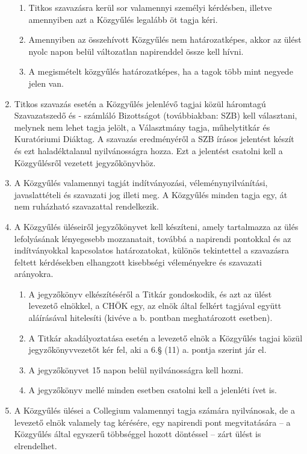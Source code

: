 \documentclass{../styles/rulebook}
\begin{document}
\begin{enumerate}
\begin{enumerate}
		\item Titkos szavazásra kerül sor valamennyi személyi kérdésben, illetve amennyiben azt a Közgyűlés legalább öt tagja kéri.
		\item Amennyiben az összehívott Közgyűlés nem határozatképes, akkor az ülést nyolc napon belül változatlan napirenddel össze kell hívni.
		\item A megismételt közgyűlés határozatképes, ha a tagok több mint negyede jelen van.
	\end{enumerate}
	\item Titkos szavazás esetén a Közgyűlés jelenlévő tagjai közül háromtagú Szavazatszedő és - számláló Bizottságot (továbbiakban: SZB) kell választani, melynek nem lehet tagja jelölt, a Választmány tagja, műhelytitkár és Kuratóriumi Diáktag. A szavazás eredményéről a SZB írásos jelentést készít és ezt haladéktalanul nyilvánosságra hozza. Ezt a jelentést csatolni kell a Közgyűlésről vezetett jegyzőkönyvhöz.
	\item A Közgyűlés valamennyi tagját indítványozási, véleménynyilvánítási, javaslattételi és szavazati jog illeti meg. A Közgyűlés minden tagja egy, át nem ruházható szavazattal rendelkezik.
	\item A Közgyűlés üléseiről jegyzőkönyvet kell készíteni, amely tartalmazza az ülés lefolyásának lényegesebb mozzanatait, továbbá a napirendi pontokkal és az indítványokkal kapcsolatos határozatokat, különös tekintettel a szavazásra feltett kérdésekben elhangzott kisebbségi véleményekre és szavazati arányokra.
	\begin{enumerate}
		\item A jegyzőkönyv elkészítéséről a Titkár gondoskodik, és azt az ülést levezető elnökkel, a CHÖK egy, az elnök által felkért tagjával együtt aláírásával hitelesíti (kivéve a b. pontban meghatározott esetben).
		\item A Titkár akadályoztatása esetén a levezető elnök a Közgyűlés tagjai közül jegyzőkönyvvezetőt kér fel, aki a 6.§ (11) a. pontja szerint jár el.
		\item A jegyzőkönyvet 15 napon belül nyilvánosságra kell hozni.
		\item A jegyzőkönyv mellé minden esetben csatolni kell a jelenléti ívet is.
	\end{enumerate}
	\item A Közgyűlés ülései a Collegium valamennyi tagja számára nyilvánosak, de a levezető elnök valamely tag kérésére, egy napirendi pont megvitatására -- a Közgyűlés által egyszerű többséggel hozott döntéssel -- zárt ülést is elrendelhet.

\end{enumerate}
\end{document}
